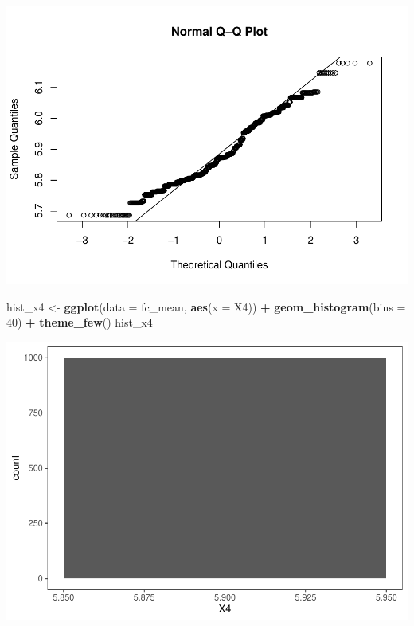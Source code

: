 \documentclass[]{article}
\newenvironment{Shaded}{\begin{snugshade}}{\end{snugshade}}
\newcommand{\DataTypeTok}[1]{\textcolor[rgb]{0.13,0.29,0.53}{#1}}
\newcommand{\DecValTok}[1]{\textcolor[rgb]{0.00,0.00,0.81}{#1}}
\newcommand{\KeywordTok}[1]{\textcolor[rgb]{0.13,0.29,0.53}{\textbf{#1}}}
\newcommand{\NormalTok}[1]{#1}
\newcommand{\OperatorTok}[1]{\textcolor[rgb]{0.81,0.36,0.00}{\textbf{#1}}}
\newcommand{\StringTok}[1]{\textcolor[rgb]{0.31,0.60,0.02}{#1}}
\begin{document}
\includegraphics{Econo2_P4_files/figure-latex/mean ic-6.pdf}

\begin{Shaded}
\begin{Highlighting}[]
\NormalTok{hist_x4 <-}\StringTok{ }\KeywordTok{ggplot}\NormalTok{(}\DataTypeTok{data =}\NormalTok{ fc_mean, }\KeywordTok{aes}\NormalTok{(}\DataTypeTok{x =}\NormalTok{ X4)) }\OperatorTok{+}\StringTok{ }\KeywordTok{geom_histogram}\NormalTok{(}\DataTypeTok{bins =} \DecValTok{40}\NormalTok{) }\OperatorTok{+}\StringTok{ }\KeywordTok{theme_few}\NormalTok{() }
\NormalTok{hist_x4}
\end{Highlighting}
\end{Shaded}

\includegraphics{Econo2_P4_files/figure-latex/mean ic-7.pdf}

\begin{Shaded}
\end{Shaded}
\end{document}

